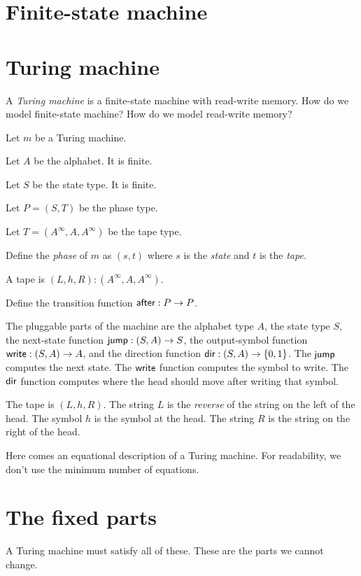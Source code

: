 \section{Finite-state machine}

\section{Turing machine}

A \emph{Turing machine} is a finite-state machine with read-write memory.
How do we model finite-state machine?
How do we model read-write memory?

Let \(m\) be a Turing machine.

Let \(A\) be the alphabet.
It is finite.

Let \(S\) be the state type.
It is finite.

Let \(P = (S,T)\) be the phase type.

Let \(T = (A^\infty,A,A^\infty)\) be the tape type.

Define the \emph{phase} of \(m\) as \((s,t)\)
where \(s\) is the \emph{state} and \(t\) is the \emph{tape}.

A tape is \((L,h,R) : (A^\infty,A,A^\infty)\).

Define the transition function \(\textsf{after} : P \to P\).

The pluggable parts of the machine are
the alphabet type \(A\),
the state type \(S\),
the next-state function \(\textsf{jump} : (S,A) \to S\),
the output-symbol function \(\textsf{write} : (S,A) \to A\),
and the direction function \(\textsf{dir} : (S,A) \to \{0,1\}\).
The \(\textsf{jump}\) computes the next state.
The \(\textsf{write}\) function computes the symbol to write.
The \(\textsf{dir}\) function computes where the head should move after writing that symbol.

The tape is \((L,h,R)\).
The string \(L\) is the \emph{reverse} of the string on the left of the head.
The symbol \(h\) is the symbol at the head.
The string \(R\) is the string on the right of the head.

Here comes an equational description of a Turing machine.
For readability, we don't use the minimum number of equations.

\section{The fixed parts}

A Turing machine must satisfy all of these.
These are the parts we cannot change.

